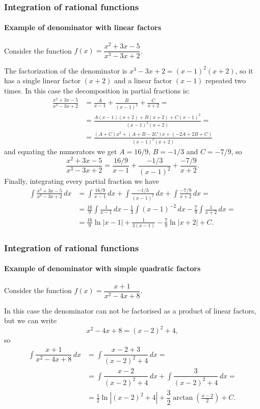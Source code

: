 \begin{frame}[allowframebreaks]
\frametitle{Integration of rational functions}
\framesubtitle{Example of denominator with linear factors}
Consider the function $f(x)=\dfrac{x^2+3x-5}{x^3-3x+2}$. 

The factorization of the denominator is $x^3-3x+2=(x-1)^2(x+2)$, so it has a single linear factor $(x+2)$ and a linear factor $(x-1)$ repeated two times.
In this case the decomposition in partial fractions is:
\begin{align*}
\frac{x^2+3x-5}{x^3-3x+2}&=\frac{A}{x-1}+\frac{B}{(x-1)^2}+\frac{C}{x+2} = \\ &= \frac{A(x-1)(x+2)+ B(x+2)+C(x-1)^2}{(x-1)^2(x+2)} = \\ &= \frac{(A+C)x^2+(A+B-2C)x+(-2A+2B+C)}{(x-1)^2(x+2)}
\end{align*}
and equating the numerators we get $A=16/9$, $B=-1/3$ and $C=-7/9$, so
\[
\frac{x^2+3x-5}{x^3-3x+2}= \frac{16/9}{x-1}+\frac{-1/3}{(x-1)^2}+\frac{-7/9}{x+2}.
\]
Finally, integrating every partial fraction we have 
\begin{align*}
\int \frac{x^2+3x-5}{x^3-3x+2}\, dx &= \int \frac{16/9}{x-1}\,dx+\int \frac{-1/3}{(x-1)^2}\,dx+\int \frac{-7/9}{x+2}\,dx = \\ &=
\frac{16}{9}\int\frac{1}{x-1}\,dx-\frac{1}{3}\int(x-1)^{-2}\,dx- \frac{7}{9}\int \frac{1}{x+2}\,dx = \\
&= \frac{16}{9}\ln|x-1|+\frac{1}{3(x-1)}-\frac{7}{9}\ln|x+2|+C.
\end{align*}
\end{frame}


\begin{frame}
\frametitle{Integration of rational functions}
\framesubtitle{Example of denominator with simple quadratic factors}
Consider the function $f(x)=\dfrac{x+1}{x^2-4x+8}$. 

In this case the denominator can not be factorised as a product of linear factors, but we can write
\[
x^2-4x+8 = (x-2)^2+4,
\]
so
\begin{align*}
\int \dfrac{x+1}{x^2-4x+8}\, dx &= \int \dfrac{x-2+3}{(x-2)^2+4}\,dx = \\
&= \int \dfrac{x-2}{(x-2)^2+4}\,dx + \int \dfrac{3}{(x-2)^2+4}\,dx = \\
&= \frac{1}{2}\ln|(x-2)^2+4| + \dfrac{3}{2}\arctan\left(\frac{x-2}{2}\right)+C.
\end{align*}
\end{frame}


